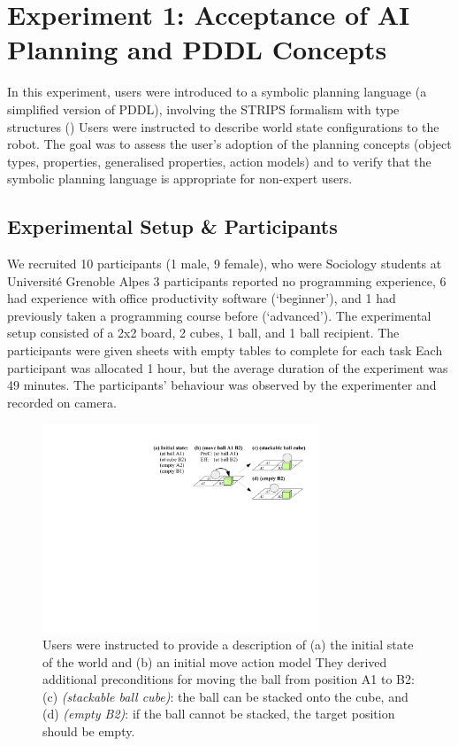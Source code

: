 
\section{Experiment 1: Acceptance of AI Planning and PDDL Concepts}\label{sec:Exp1}

In this experiment, users were introduced to a symbolic planning language (a simplified version of PDDL), involving the STRIPS formalism with type structures ()
Users were instructed to describe world state configurations to the robot.
The goal was to assess the user's adoption of the planning concepts (object types, properties, generalised properties, action models) and to verify that the symbolic planning language is appropriate for non-expert users.
\subsection{Experimental Setup \& Participants}
We recruited 10 participants (1 male, 9 female), who were Sociology students at Universit\'{e} Grenoble Alpes
3 participants reported no programming experience, 6  had experience with office productivity software (`beginner'), and 1 had previously taken a programming course before (`advanced').
%
The experimental setup consisted of a 2x2 board, 2 cubes, 1 ball, and 1 ball recipient.
The participants were given sheets with empty tables to complete for each task
Each participant was allocated 1 hour, but the average duration of the experiment was 49 minutes.
The participants' behaviour was observed by the experimenter and recorded on camera. 

 \begin{figure}[t]
  \centering
  \includegraphics[width=8.3cm]{figures/scenarios-exp1}
  \caption{Users were instructed to provide a description of (a) the initial state of the world and (b) an initial move action model
They derived additional preconditions for moving the ball from position A1 to B2: (c) \textit{(stackable ball cube)}: the ball can be stacked onto the cube, and (d) \textit{(empty B2)}: if the ball cannot be stacked, the target position should be empty.}
  \label{fig:scenarios-exp1}
 \end{figure}
 
